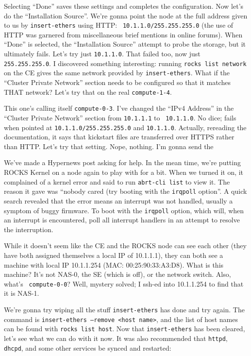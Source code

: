 \documentclass[12pt]{article}
\begin{document}
Selecting ``Done'' saves these settings and completes the configuration. Now
let's do the ``Installation Source''. We're gonna point the node at the full
address given to us by {\tt insert-ethers} using HTTP: {\tt
  10.1.1.0/255.255.255.0} (the use of HTTP was garnered from miscellaneous
brief mentions in online forums). When ``Done'' is selected, the ``Installation
Source'' attempt to probe the storage, but it ultimately fails. Let's try just
{\tt 10.1.1.0}. That failed too, now just {\tt 255.255.255.0}. I discovered
something interesting: running {\tt rocks list network} on the CE gives the same
network provided by {\tt insert-ethers}. What if the ``Cluster Private Network''
section needs to be configured so that it matches THAT network? Let's try that
on the real {\tt compute-1-4}.

\qq This one's calling itself {\tt compute-0-3}. I've changed the ``IPv4
Address'' in the ``Cluster Private Network'' section from {\tt 10.1.1.1} to {\tt
  10.1.1.0}. No dice; fails when pointed at {\tt 10.1.1.0/255.255.255.0} and
{\tt 10.1.1.0}. Actually, rereading the documentation, it says that kickstart
files are transferred over HTTPS rather than HTTP. Let's try that setting. Nope,
nothing. I'm gonna send the 

\qq We've made a Hypernews post asking for help. In the mean time, we're putting
ROCKS Kernel on a node again to play with for a bit. When we turned it on, it
complained of a kernel error and said to run {\tt abrt-cli list} to view it. The
reason it gave was ``nobody cared (try booting with the {\tt irqpoll}
option''. A quick search revealed that the error means an interrupt was not
handled, usually a symptom of buggy firmware. To boot with the {\tt irqpoll}
option, which will, when an interrupt is encountered, poll all interrupt
handlers in an attempt to resolve the interruption. 

\qq While it doesn't seem like the CE and the ROCKS node can see each other
(they have both assigned themselves a local IP of 10.1.1.1), they can both see a
machine with local IP 10.1.1.254 (MAC: 00:25:90:33:A3:D8). What is this machine?
It's not NAS-0, the SE (which is off), or the network switch. Also, what's {\tt
  compute-0-0}? Well, mystery solved; I ssh-ed into 10.1.1.254 to find that it
is NAS-1. 

\qq We're gonna try wiping all the stuff {\tt insert-ethers} has done and try
again. The command is {\tt insert-ethers --remove <host name>}, and the list of
host names can be found with {\tt rocks list host}. Now that {\tt insert-ethers}
has been cleared, let's see what we can do with it now. It was also recommended
that {\tt httpd}, {\tt dhcpd}, and some other services be synced and restarted:
\end{document}
